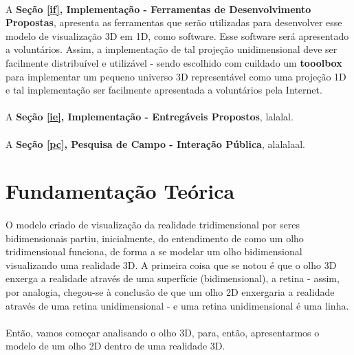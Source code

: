 \documentclass{article}
\begin{document}
	\paragraph{}
	A \textbf{Seção \ref{if}, Implementação - Ferramentas de Desenvolvimento Propostas}, apresenta as ferramentas que serão utilizadas para desenvolver esse modelo de visualização 3D em 1D, como software. Esse software será apresentado a voluntários. Assim, a implementação de tal projeção unidimensional deve ser facilmente distribuível e utilizável - sendo escolhido com cuildado um \textbf{tooolbox} para implementar um pequeno universo 3D representável como uma projeção 1D e tal implementação ser facilmente apresentada a voluntários pela Internet.
	
	\paragraph{}
	A \textbf{Seção \ref{ie}, Implementação - Entregáveis Propostos}, lalalal.
	
	\paragraph{}
	A \textbf{Seção \ref{pc}, Pesquisa de Campo - Interação Pública}, alalalaal.
	
	\section{Fundamentação Teórica} \label{ft}
	\paragraph{}
	O modelo criado de visualização da realidade tridimensional por seres bidimensionais partiu, inicialmente, do entendimento de como um olho tridimensional funciona, de forma a se modelar um olho bidimensional visualizando uma realidade 3D. A primeira coisa que se notou é que o olho 3D enxerga a realidade através de uma superfície (bidimensional), a retina - assim, por analogia, chegou-se à conclusão de que um olho 2D enxergaria a realidade através de uma retina unidimensional - e uma retina unidimensional é uma linha.
	
	\paragraph{}
	Então, vamos começar analisando o olho 3D, para, então, apresentarmos o modelo de um olho 2D dentro de uma realidade 3D.
	
\end{document}
